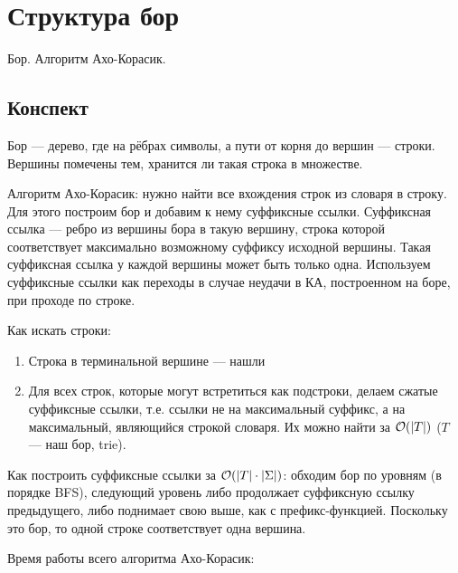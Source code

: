 \section{Структура бор}
Бор. Алгоритм Ахо-Корасик.

\subsection{Конспект}
Бор --- дерево, где на рёбрах символы,
а пути от корня до вершин --- строки.
Вершины помечены тем, хранится ли такая строка
в множестве.

Алгоритм Ахо-Корасик:
нужно найти все вхождения строк из словаря в строку.
Для этого построим бор
и добавим к нему суффиксные ссылки.
Суффиксная ссылка --- ребро из вершины бора в такую вершину,
строка которой соответствует максимально возможному суффиксу
исходной вершины.
Такая суффиксная ссылка у каждой вершины может быть только одна.
Используем суффиксные ссылки как переходы в случае неудачи в КА,
построенном на боре, при проходе по строке.

Как искать строки:
\begin{enumerate}
    \item Строка в терминальной вершине --- нашли
    \item Для всех строк, которые могут встретиться как подстроки,
    делаем сжатые суффиксные ссылки,
    т.е. ссылки не на максимальный суффикс,
    а на максимальный, являющийся строкой словаря.
    Их можно найти за $\mathcal{O}(|T|)$ ($T$ --- наш бор, trie).
\end{enumerate}

Как построить суффиксные ссылки за $\mathcal{O}(|T| \cdot |\Sigma|)$:
обходим бор по уровням (в порядке BFS),
следующий уровень либо продолжает суффиксную ссылку предыдущего,
либо поднимает свою выше, как с префикс-функцией.
Поскольку это бор, то одной строке соответствует одна вершина.

Время работы всего алгоритма Ахо-Корасик:
